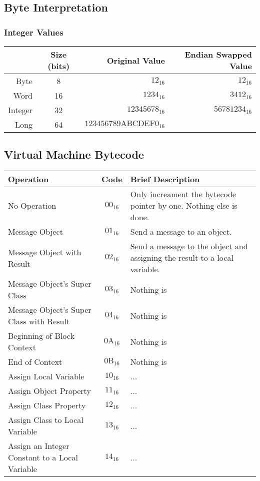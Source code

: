 \subsection {Byte Interpretation}

\subsubsection{Integer Values}

\begin{center}
  \begin{tabular}{ r | c r r }
    & Size (bits) & Original Value & Endian Swapped Value\\ \hline
    Byte & 8 & $12_{16}$ & $12_{16}$ \\
    Word & 16 & $1234_{16}$ & $3412_{16}$ \\
    Integer & 32 & $12345678_{16}$ & $56781234_{16}$ \\
    Long & 64 & $\mathrm{123456789ABCDEF0}_{16}$ & \\
  \end{tabular}
\end{center}

\subsection{Virtual Machine Bytecode}

\begin{center}
  \begin{tabular}{ | p{6cm} | c | p{8cm} | }
    \hline
    Operation & Code & Brief Description \\ \hline
    No Operation & $00_{16}$ & Only increament the bytecode pointer by one.
                              Nothing else is done. \\
    Message Object & $01_{16}$ & Send a message to an object. \\
    Message Object with Result & $02_{16}$ & Send a message to the object
                                            and assigning the result to a
                                            local variable. \\
    Message Object's Super Class & $03_{16}$ & Nothing is \\
    Message Object's Super Class with Result & $04_{16}$ & Nothing is \\
    Beginning of Block Context & $\mathrm{0A}_{16}$ & Nothing is \\
    End of Context & $\mathrm{0B}_{16}$ & Nothing is \\
    Assign Local Variable & $10_{16}$ & ...\\
    Assign Object Property & $11_{16}$ & ...\\
    Assign Class Property & $12_{16}$ & ...\\
    Assign Class to Local Variable & $13_{16}$ & ...\\
    Assign an Integer Constant to a Local Variable & $14_{16}$ & ...\\
    \hline
  \end{tabular}
\end{center}

